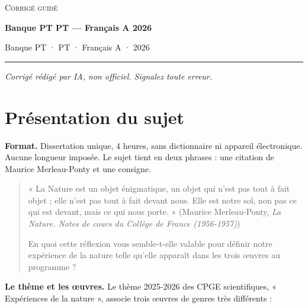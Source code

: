 \documentclass[11pt,a4paper]{article}
\begin{document}
\thispagestyle{plain}
\begin{center}
  {\small\scshape Corrigé guidé}\par\smallskip
  {\LARGE\bfseries Banque PT PT — Français A 2026\par}\medskip
  {\large Banque PT · PT · Français A · 2026\par}
\end{center}
\vspace{2pt}\hrule\vspace{8pt}

\emph{Corrigé rédigé par IA, non officiel. Signalez toute erreur.}

\hypertarget{pruxe9sentation-du-sujet}{%
\section{Présentation du sujet}\label{pruxe9sentation-du-sujet}}

\textbf{Format.} Dissertation unique, 4 heures, sans dictionnaire ni appareil électronique. Aucune longueur imposée. Le sujet tient en deux phrases : une citation de Maurice Merleau-Ponty et une consigne.

\begin{quote}

« La Nature est un objet énigmatique, un objet qui n'est pas tout à fait objet ; elle n'est pas tout à fait devant nous. Elle est notre sol, non pas ce qui est devant, mais ce qui nous porte. » (Maurice Merleau-Ponty, \emph{La Nature. Notes de cours du Collège de France (1956-1957)})

En quoi cette réflexion vous semble-t-elle valable pour définir notre expérience de la nature telle qu'elle apparaît dans les trois œuvres au programme ?

\end{quote}

\textbf{Le thème et les œuvres.} Le thème 2025-2026 des CPGE scientifiques, « Expériences de la nature », associe trois œuvres de genres très différents :
\end{document}
